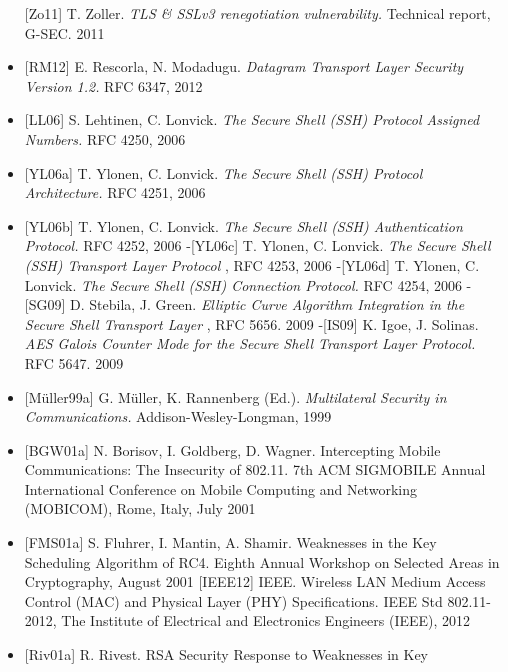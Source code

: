 \documentclass[a4paper]{article}
\begin{document}
\begin{multicols}{3}
\begin{itemize}
              {[}Zo11{]} T. Zoller. \emph{TLS \& SSLv3 renegotiation vulnerability.}
              Technical report, G-SEC. 2011
        \item
              {[}RM12{]} E. Rescorla, N. Modadugu. \emph{Datagram Transport Layer
                  Security Version 1.2.} RFC 6347, 2012
        \item
              {[}LL06{]} S. Lehtinen, C. Lonvick. \emph{The Secure Shell (SSH)
                  Protocol Assigned Numbers.} RFC 4250, 2006
        \item
              {[}YL06a{]} T. Ylonen, C. Lonvick. \emph{The Secure Shell (SSH)
                  Protocol Architecture.} RFC 4251, 2006
        \item
              {[}YL06b{]} T. Ylonen, C. Lonvick. \emph{The Secure Shell (SSH)
                  Authentication Protocol.} RFC 4252, 2006 -{[}YL06c{]} T. Ylonen, C.
              Lonvick. \emph{The Secure Shell (SSH) Transport Layer Protocol} , RFC
              4253, 2006 -{[}YL06d{]} T. Ylonen, C. Lonvick. \emph{The Secure Shell
                  (SSH) Connection Protocol.} RFC 4254, 2006 -{[}SG09{]} D. Stebila, J.
              Green. \emph{Elliptic Curve Algorithm Integration in the Secure Shell
                  Transport Layer} , RFC 5656. 2009 -{[}IS09{]} K. Igoe, J. Solinas.
              \emph{AES Galois Counter Mode for the Secure Shell Transport Layer
                  Protocol.} RFC 5647. 2009
        \item
              {[}Müller99a{]} G. Müller, K. Rannenberg (Ed.). \emph{Multilateral
                  Security in Communications.} Addison-Wesley-Longman, 1999
        \item
              {[}BGW01a{]} N. Borisov, I. Goldberg, D. Wagner. Intercepting Mobile
              Communications: The Insecurity of 802.11. 7th ACM SIGMOBILE Annual
              International Conference on Mobile Computing and Networking (MOBICOM),
              Rome, Italy, July 2001
        \item
              {[}FMS01a{]} S. Fluhrer, I. Mantin, A. Shamir. Weaknesses in the Key
              Scheduling Algorithm of RC4. Eighth Annual Workshop on Selected Areas
              in Cryptography, August 2001 {[}IEEE12{]} IEEE. Wireless LAN Medium
              Access Control (MAC) and Physical Layer (PHY) Specifications. IEEE Std
              802.11-2012, The Institute of Electrical and Electronics Engineers
              (IEEE), 2012
        \item
              {[}Riv01a{]} R. Rivest. RSA Security Response to Weaknesses in Key

\end{itemize}
\end{multicols}
\end{document}

